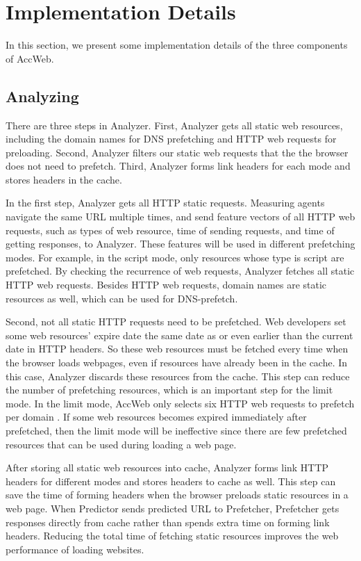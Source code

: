 \section{Implementation Details}
\label{sec:details}

In this section, we present some implementation details of the three components of AccWeb.

\subsection{Analyzing}

There are three steps in Analyzer. First, Analyzer gets all static web resources, including the domain names for DNS prefetching and HTTP web requests for preloading. Second, Analyzer filters our static web requests that the the browser does not need to prefetch. Third, Analyzer forms link headers for each mode and stores headers in the cache.

In the first step, Analyzer gets all HTTP static requests. Measuring agents navigate the same URL multiple times, and send feature vectors of all HTTP web requests, such as types of web resource, time of sending requests, and time of getting responses, to Analyzer. These features will be used in different prefetching modes. For example, in the script mode, only resources whose type is script are prefetched. By checking the recurrence of web requests, Analyzer fetches all static HTTP web requests. Besides HTTP web requests, domain names are static resources as well, which can be used for DNS-prefetch.

Second, not all static HTTP requests need to be prefetched. Web developers set some web resources' expire date the same date as or even earlier than the current date in HTTP headers. So these web resources must be fetched every time when the browser loads webpages, even if resources have already been in the cache. In this case, Analyzer discards these resources from the cache. This step can reduce the number of prefetching resources, which is an important step for the limit mode. In the limit mode, AccWeb only selects six HTTP web requests to prefetch per domain . If some web resources becomes expired immediately after prefetched, then the limit mode will be ineffective since there are few prefetched resources that can be used during loading a web page.

After storing all static web resources into cache, Analyzer forms link HTTP headers for different modes and stores headers to cache as well. This step can save the time of forming headers when the browser preloads static resources in a web page. When Predictor sends predicted URL to Prefetcher, Prefetcher gets responses directly from cache rather than spends extra time on forming link headers. Reducing the total time of fetching static resources improves the web performance of loading websites.  

